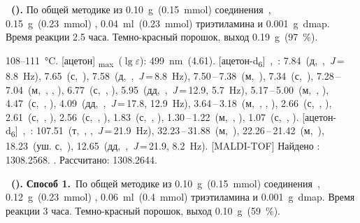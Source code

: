 \textbf{~().} 
По общей методике из \SI{0.10}{\gram}~(\SI{0.15}{\milli\mole}) соединения~, \SI{0.15}{\gram}~(\SI{0.23}{\milli\mole}) , \SI{0.04}{\milli\litre}~(\SI{0.23}{\milli\mole}) триэтиламина и \SI{0.001}{\gram}~\ac{dmap}.
Время реакции 2.5 часа.
Темно-красный порошок, выход \SI{0.19}{\gram}~(\SI{97}{\percent}).
\begin{experimental}
     108--\SI{111}{\celsius}.
    [ацетон] \chemlambda\textsubscript{max}~($\lg \varepsilon$): \SI{499}{\nano\metre}~(4.61).
    [ацетон-d\textsubscript{6}]~\chemdelta,~\si{\ppm}: 7.84~(д,~,~\textit{J}\,=\,8.8~\si{\hertz}), 7.65~(с,~), 7.58~(д,~,~\textit{J}\,=\,8.8~\si{\hertz}), 7.50\,--\,7.38~(м,~), 7.34~(с,~), 7.28\,--\,7.04~(м,~, , ), 6.77~(с,~, ), 5.95~(дд,~,~\textit{J}\,=\,12.9, 5.7~\si{\hertz}), 5.17\,--\,5.00~(м,~, ), 4.47~(с,~, ), 4.09~(дд,~,~\textit{J}\,=\,17.8, 12.9~\si{\hertz}), 3.64\,--\,3.18~(м,~, , ), 2.66~(с,~, ), 2.61~(с,~, ), 2.56~(с,~, ), 1.83~(с,~, ), 1.30\,--\,1.22~(м,~, ), 1.07~(с,~, ).
    [ацетон-d\textsubscript{6}]~\chemdelta,~\si{\ppm}: 107.51~(т,~, ,~\textit{J}\,=\,21.9~\si{\hertz}), 32.23\,--\,31.88~(м,~), 22.26\,--\,21.42~(м,~), 18.23~(уш. с,~), 12.65~(дд,~,~\textit{J}\,=\,21.9, 8.2~\si{\hertz}).
    [MALDI-TOF] Найдено \ce{[M + H]+}: \num{1308.2568}. . Рассчитано: \ce{[M + H]} \num{1308.2644}.
\end{experimental}


\textbf{~().} 
\textbf{Способ 1.}~По общей методике из \SI{0.10}{\gram}~(\SI{0.15}{\milli\mole}) соединения~, \SI{0.12}{\gram}~(\SI{0.23}{\milli\mole}) , \SI{0.06}{\milli\litre}~(\SI{0.4}{\milli\mole}) триэтиламина и \SI{0.001}{\gram}~\ac{dmap}.
Время реакции 3 часа.
Темно-красный порошок, выход \SI{0.10}{\gram}~(\SI{59}{\percent}).

